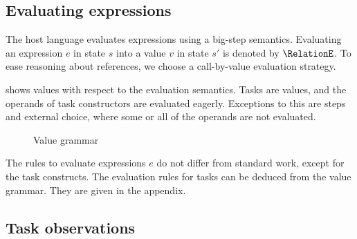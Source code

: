 \subsection{Evaluating expressions}
\label{sec:evaluation}

The host language evaluates expressions using a big-step semantics.
Evaluating an expression $e$ in state $s$ into a value $v$ in state $s'$ is denoted by $\RelationE$.
To ease reasoning about references, we choose a call-by-value evaluation strategy.

 shows values with respect to the evaluation semantics.
Tasks are values, and the operands of task constructors are evaluated eagerly.
Exceptions to this are steps and external choice, where some or all of the operands are not evaluated.

\begin{figure}[h]
  \small
  \caption{Value grammar} \label{fig:value-grammar}
\end{figure}
The rules to evaluate expressions $e$ do not differ from standard work, except for the task constructs.
The evaluation rules for tasks can be deduced from the value grammar.
They are given in the appendix. 

%
%


\subsection{Task observations}



